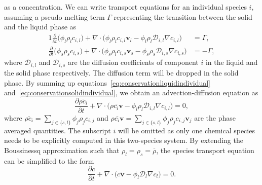 as a concentration.
We can write transport equations for an individual species $i$, assuming a pseudo melting term $\Gamma$ representing the transition between the solid 
and the liquid phase as
\begin{alignat}{1}
\label{eq:conservationliquidindividual}
\frac{\partial}{\partial t}\big( \phi_l \rho_l c_{i,l} \big)  + \nabla \cdot \big(\phi_l \rho_l c_{i,l} \mathbf{v}_l - \phi_l \rho_l \mathcal{D}_{i,l} \nabla c_{i,l} \big) &= \Gamma ,\\
\label{eq:conservationsolidindividual}
\frac{\partial}{\partial t}\big( \phi_s \rho_s c_{i,s} \big)  + \nabla \cdot \big(\phi_s \rho_l c_{i,s} \mathbf{v}_s - \phi_s \rho_s \mathcal{D}_{i,s} \nabla c_{i,s} \big) &= -\Gamma ,
\end{alignat}
where $\mathcal{D}_{i,l}$ and $\mathcal{D}_{i,s}$ are the diffusion coefficients
of component $i$ in the liquid and the solid phase respectively. 
The diffusion term will be dropped in the solid phase.
By summing up equations~\eqref{eq:conservationliquidindividual} 
and~\eqref{eq:conservationsolidindividual},
we obtain an advection-diffusion equation as
\begin{equation} \label{eq:specietransport}
		  \frac{\partial \overline{\rho c_{i}}}{\partial t} + \nabla \cdot \big( \overline{\rho c_{i} \mathbf{v}} - \phi_l \rho_l \mathcal{D}_{i,l} \nabla c_{i,l} \big) = 0,
\end{equation}
where  
$\overline{\rho c_i} = \sum_{j\in \{s,l\}} \phi_j \rho_j c_{i,j}$ 
and $\overline{\rho c_i \mathbf{v}} = \sum_{j\in \{s,l\}} \phi_j \rho_j c_{i,j} \mathbf{v}_j$
are the phase averaged quantities.
The subscript $i$ will be omitted as only one chemical species needs to be
explicitly computed
in this two-species system.
By extending the Boussinessq approximation such that 
$\rho_l = \rho_s = \overline{\rho}$, the 
species transport equation can be simplified to the form
\begin{equation}\label{eq:specietransportsimplified}
\frac{\partial \overline{c}}{\partial t} + \nabla \cdot \big( \overline{ c \mathbf{v}} - \phi_l \mathcal{D}_{l} \nabla c_l \big) = 0.
\end{equation}

